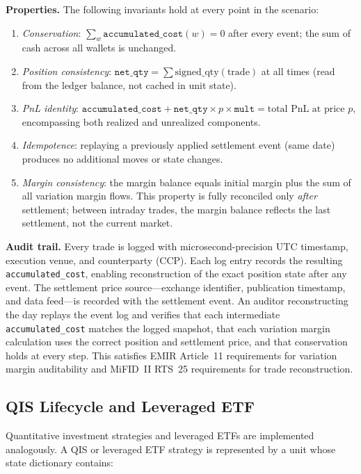 \documentclass[11pt,a4paper]{article}
\begin{document}
\medskip
\noindent\textbf{Properties.}
The following invariants hold at every point in the scenario:

\begin{enumerate}[nosep]
\item \emph{Conservation}: $\sum_w \texttt{accumulated\_cost}(w) = 0$ after every event; the sum of cash across all wallets is unchanged.
\item \emph{Position consistency}: $\texttt{net\_qty} = \sum \text{signed\_qty}(\text{trade})$ at all times (read from the ledger balance, not cached in unit state).
\item \emph{PnL identity}: $\texttt{accumulated\_cost} + \texttt{net\_qty} \times p \times \texttt{mult} = \text{total PnL at price } p$, encompassing both realized and unrealized components.
\item \emph{Idempotence}: replaying a previously applied settlement event (same date) produces no additional moves or state changes.
\item \emph{Margin consistency}: the margin balance equals initial margin plus the sum of all variation margin flows.  This property is fully reconciled only \emph{after} settlement; between intraday trades, the margin balance reflects the last settlement, not the current market.
\end{enumerate}

\medskip
\noindent\textbf{Audit trail.}
Every trade is logged with microsecond-precision UTC timestamp, execution venue, and counterparty (CCP).
Each log entry records the resulting \texttt{accumulated\_cost}, enabling reconstruction of the exact position state after any event.
The settlement price source---exchange identifier, publication timestamp, and data feed---is recorded with the settlement event.
An auditor reconstructing the day replays the event log and verifies that each intermediate \texttt{accumulated\_cost} matches the logged snapshot, that each variation margin calculation uses the correct position and settlement price, and that conservation holds at every step.
This satisfies EMIR Article~11 requirements for variation margin auditability and MiFID~II RTS~25 requirements for trade reconstruction.

\subsection{QIS Lifecycle and Leveraged ETF}

Quantitative investment strategies and leveraged ETFs are implemented analogously. A QIS or leveraged ETF strategy is represented by a unit whose state dictionary contains:
\end{document}
